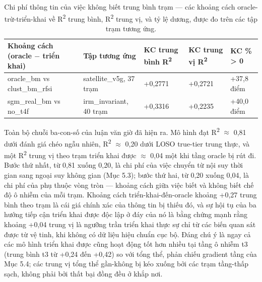 {\small
\begin{longtable}{lllll}
\caption{Chi phí thông tin của việc không biết trung bình trạm --- các khoảng cách oracle-trừ-triển-khai về R\textsuperscript{2} trung bình, R\textsuperscript{2} trung vị, và tỷ lệ dương, được đo trên các tập trạm tương ứng.}\\
\toprule
\textbf{Khoảng cách (oracle $-$ triển khai)} & \textbf{Tập tương ứng} & \textbf{KC trung bình R\textsuperscript{2}} & \textbf{KC trung vị R\textsuperscript{2}} & \textbf{KC \% > 0} \\
\midrule\endhead
oracle\_bm vs clust\_bm\_rfsi & satellite\_v5g, 37 trạm & +0,2771 & +0,2721 & +37,8 điểm \\
sgm\_real\_bm vs no\_t4f & irm\_invariant, 40 trạm & +0,3316 & +0,2235 & +40,0 điểm \\
\bottomrule
\end{longtable}
}


Toàn bộ chuỗi ba-con-số của luận văn giờ đã hiện ra. Mô hình đạt R\textsuperscript{2} $\approx$ 0,81 dưới đánh giá chéo ngẫu nhiên, R\textsuperscript{2} $\approx$ 0,20 dưới LOSO true-tier trung thực, và một R\textsuperscript{2} trung vị theo trạm triển khai được $\approx$ 0,04 một khi tầng oracle bị rút đi. Bước thứ nhất, từ 0,81 xuống 0,20, là chi phí của việc chuyển từ nội suy thời gian sang ngoại suy không gian (Mục 5.3); bước thứ hai, từ 0,20 xuống 0,04, là chi phí của phụ thuộc vòng tròn --- khoảng cách giữa việc biết và không biết chế độ ô nhiễm của mỗi trạm. Khoảng cách triển-khai-đến-oracle khoảng +0,27 trung bình theo trạm là cái giá chính xác của thông tin bị thiếu đó, và sự hội tụ của ba hướng tiếp cận triển khai được độc lập ở đáy của nó là bằng chứng mạnh rằng khoảng +0,04 trung vị là ngưỡng trần triển khai thực sự chỉ từ các biến quan sát được từ vệ tinh, khi không có dữ liệu hiệu chuẩn cục bộ. Đáng chú ý là ngay cả các mô hình triển khai được cũng hoạt động tốt hơn nhiều tại tầng ô nhiễm t3 (trung bình t3 từ +0,24 đến +0,42) so với tổng thể, phản chiếu gradient tầng của Mục 5.4; các trung vị tổng thể gần-không bị kéo xuống bởi các trạm tầng-thấp sạch, không phải bởi thất bại đồng đều ở khắp nơi.

